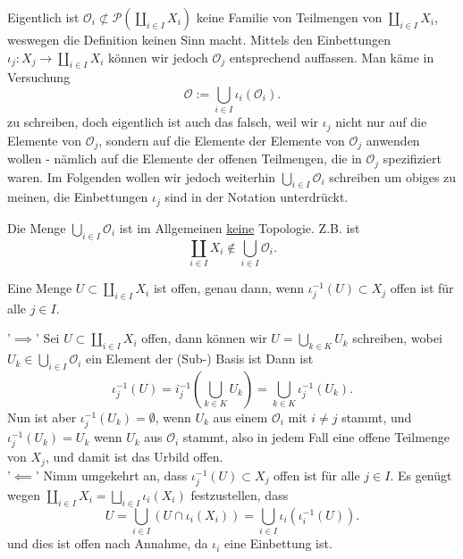\begin{dabuse}
    Eigentlich ist $\mathcal{O}_i \not \subset \mathcal{P}(\coprod _{i \in I}X_i)$ keine Familie von Teilmengen von $\coprod _{i \in I}X_i$, weswegen die Definition keinen Sinn macht. Mittels den Einbettungen $ι_j:X_j \to  \coprod _{i \in I}X_i$ können wir jedoch $\mathcal{O}_j$ entsprechend auffassen. Man käme in Versuchung
    \[
        \mathcal{O} := \bigcup_{i \in  I} ι_i(\mathcal{O}_i)
    .\] 
    zu schreiben, doch eigentlich ist auch das falsch, weil wir $ι_j$ nicht nur auf die Elemente von  $\mathcal{O}_j$, sondern auf die Elemente der Elemente von $\mathcal{O}_j$ anwenden wollen - nämlich auf die Elemente der offenen Teilmengen, die in $\mathcal{O}_j$ spezifiziert waren. Im Folgenden wollen wir jedoch weiterhin $\bigcup_{i \in  I} \mathcal{O}_i$ schreiben um obiges zu meinen, die Einbettungen $ι_j$ sind in der Notation unterdrückt.
\end{dabuse}

\begin{warning}
    Die Menge $\bigcup_{i \in  I} \mathcal{O}_i$ ist im Allgemeinen \underline{keine} Topologie. Z.B. ist
    \[
    \coprod_{i \in I}X_i \not\in \bigcup_{i \in  I} \mathcal{O}_i
    .\] 
\end{warning}

\begin{dlemma}
   Eine Menge $U\subset \coprod_{i \in I}X_i$ ist offen, genau dann, wenn $ι_j^{-1}(U)\subset X_j$ offen ist für alle $j\in I$.
\end{dlemma}

\begin{proof*}
'$\implies$'    Sei $U\subset \coprod_{i \in I}X_i$ offen, dann können wir $U = \bigcup_{k\in K}U_k$ schreiben, wobei $U_k \in \bigcup_{i \in  I} \mathcal{O}_i$ ein Element der (Sub-) Basis ist Dann ist
    \[
        ι_j^{-1} (U) = i_j^{-1} \left( \bigcup_{k\in K} U_k \right)  = \bigcup_{k\in K} ι_j^{-1}(U_k) 
    .\] 
    Nun ist aber $ι_j^{-1}(U_k) =\emptyset$, wenn $U_k$ aus einem  $\mathcal{O}_i$ mit $i\neq j$ stammt, und $ι_j^{-1}(U_k) = U_k$ wenn $U_k$ aus  $\mathcal{O}_i$ stammt, also in jedem Fall eine offene Teilmenge von $X_j$, und damit ist das Urbild offen. \\
    '$\impliedby$' Nimm umgekehrt an, dass $ι_j^{-1}(U)\subset X_j$ offen ist für alle $j\in I$. Es genügt wegen $\coprod _{i \in I}X_i = \bigsqcup_{i \in I}ι_i(X_i)$ festzustellen, dass
    \[
        U = \bigcup_{i \in  I} (U \cap ι_i(X_i)) = \bigcup _{i \in I}ι_i(ι_i^{-1}(U))
    .\] 
    und dies ist offen nach Annahme, da $ι_i$ eine Einbettung ist.
\end{proof*}

